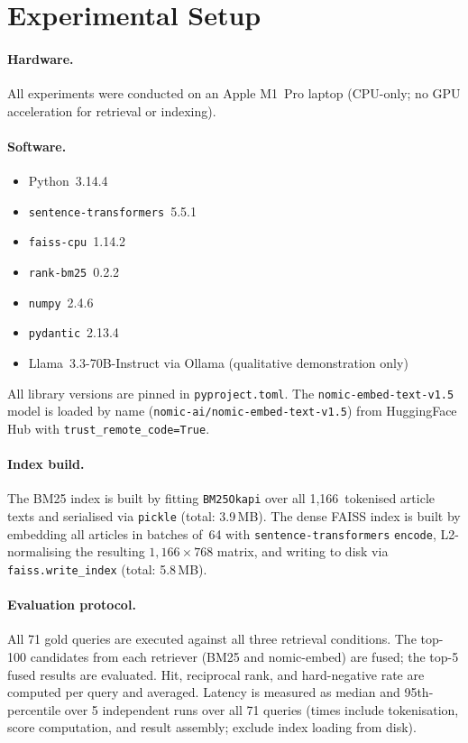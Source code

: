 \documentclass[sigconf,screen]{acmart}
\newcommand{\nomic}{\texttt{nomic-embed-text-v1.5}\xspace}
\newcommand{\nomicshort}{nomic-embed\xspace}
\begin{document}
\section{Experimental Setup}
\label{sec:setup}

\paragraph{Hardware.}
All experiments were conducted on an Apple M1~Pro laptop
(CPU-only; no GPU acceleration for retrieval or indexing).

\paragraph{Software.}
\begin{itemize}
  \item Python~3.14.4
  \item \texttt{sentence-transformers}~5.5.1~\cite{reimers2019sbert}
  \item \texttt{faiss-cpu}~1.14.2
  \item \texttt{rank-bm25}~0.2.2
  \item \texttt{numpy}~2.4.6
  \item \texttt{pydantic}~2.13.4
  \item Llama~3.3-70B-Instruct via Ollama
        (qualitative demonstration only)
\end{itemize}

All library versions are pinned in \texttt{pyproject.toml}.  The
\nomic model is loaded by name (\texttt{nomic-ai/nomic-embed-text-v1.5})
from HuggingFace Hub with \texttt{trust\_remote\_code=True}.

\paragraph{Index build.}
The BM25 index is built by fitting \texttt{BM25Okapi} over all
1{,}166~tokenised article texts and serialised via \texttt{pickle}
(total: 3.9\,MB).  The dense FAISS index is built by embedding all
articles in batches of~64 with \texttt{sentence-transformers}
\texttt{encode}, L2-normalising the resulting
$1{,}166 \times 768$ matrix, and writing to disk via
\texttt{faiss.write\_index} (total: 5.8\,MB).

\paragraph{Evaluation protocol.}
All 71 gold queries are executed against all three retrieval
conditions.  The top-100 candidates from each retriever (BM25 and
\nomicshort) are fused; the top-5 fused results are evaluated.
Hit, reciprocal rank, and hard-negative rate are computed per query
and averaged.  Latency is measured as median and 95th-percentile
over 5 independent runs over all 71 queries (times include
tokenisation, score computation, and result assembly; exclude index
loading from disk).
\end{document}
